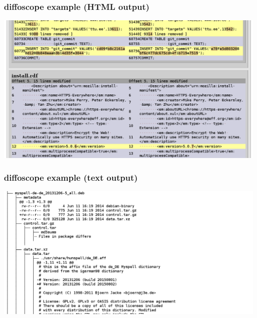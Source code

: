 \documentclass[14pt,aspectratio=169]{beamer}
\begin{document}
\begin{frame}
 \frametitle{diffoscope example (HTML output)}

 \begin{center}
  \includegraphics[width=0.9\paperwidth]{images/diffoscope_example_html.png}
 \end{center}
\end{frame}

\begin{frame}
 \frametitle{diffoscope example (text output)}

 \begin{center}
  \includegraphics[width=0.9\paperwidth]{images/diffoscope_example_text.png}
 \end{center}
\end{frame}
\end{document}
